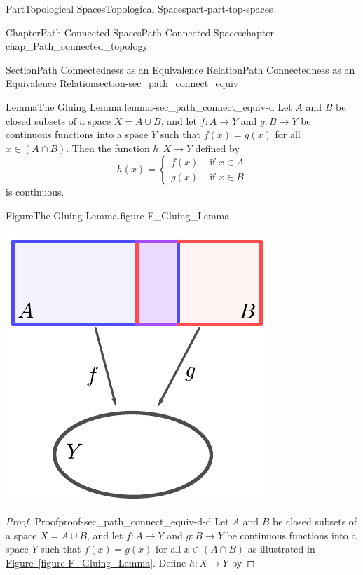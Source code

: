 \documentclass[oneside,10pt,]{book}
\newcommand{\xreffont}{\relax}
\numberwithin{equation}{chapter}
\newcommand{\amp}{&}
\begin{document}
\begin{partptx}{Part}{Topological Spaces}{}{Topological Spaces}{}{}{part-part-top-spaces}
\begin{chapterptx}{Chapter}{Path Connected Spaces}{}{Path Connected Spaces}{}{}{chapter-chap_Path_connected_topology}
\begin{sectionptx}{Section}{Path Connectedness as an Equivalence Relation}{}{Path Connectedness as an Equivalence Relation}{}{}{section-sec_path_connect_equiv}
\begin{lemma}{Lemma}{The Gluing Lemma.}{}{lemma-sec_path_connect_equiv-d}%
%
Let \(A\) and \(B\) be closed subsets of a space \(X = A \cup B\), and let \(f:A \to Y\) and \(g: B \to Y\) be continuous functions into a space \(Y\) such that \(f(x)=g(x)\) for all \(x \in (A \cap B)\). Then the function \(h:X \to Y\) defined by%
\begin{equation*}
h(x) = \begin{cases}f(x) \amp \text{ if }  x \in A \\ g(x) \amp \text{ if }  x \in B \end{cases}
\end{equation*}
is continuous.%
\begin{figureptx}{Figure}{The Gluing Lemma.}{figure-F_Gluing_Lemma}{}%
\begin{image}{0.25}{0.5}{0.25}{}%
\includegraphics[width=\linewidth]{external/Gluing_Lemma.pdf}
\end{image}%
\tcblower
\end{figureptx}%
\end{lemma}
\begin{proof}{Proof}{}{proof-sec_path_connect_equiv-d-d}
Let \(A\) and \(B\) be closed subsets of a space \(X = A \cup B\), and let \(f:A \to Y\) and \(g: B \to Y\) be continuous functions into a space \(Y\) such that \(f(x)=g(x)\) for all \(x \in (A \cap B)\) as illustrated in \hyperref[figure-F_Gluing_Lemma]{Figure~{\xreffont\ref{figure-F_Gluing_Lemma}}}. Define \(h: X \to Y\) by%

\end{proof}
\end{sectionptx}
\end{chapterptx}
\end{partptx}
\end{document}
